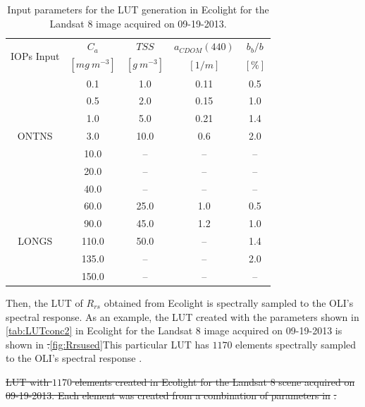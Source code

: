 \documentclass[onecolumn,3p,letterpaper]{elsarticle}
\providecommand{\DIFaddtex}[1]{{\protect\color{blue}\uwave{#1}}} %
\providecommand{\DIFdeltex}[1]{{\protect\color{red}\sout{#1}}}                      %
\providecommand{\DIFaddbegin}{} %
\providecommand{\DIFaddend}{} %
\providecommand{\DIFdelbegin}{} %
\providecommand{\DIFdelend}{} %
\providecommand{\DIFdelFL}[1]{\DIFdel{#1}} %
\providecommand{\DIFadd}[1]{\texorpdfstring{\DIFaddtex{#1}}{#1}} %
\providecommand{\DIFdel}[1]{\texorpdfstring{\DIFdeltex{#1}}{}} %
\begin{document}
\begin{table}[htb]
\caption{Input parameters for the LUT generation in Ecolight for the Landsat 8 image acquired on 09-19-2013. \label{tab:LUTconc2}} 
\small
\centering
    \begin{tabular}{ccccc}
    \hline \hline
    \multirow{2}{*}{IOPs Input} & \bfseries{$C_a$}    & \bfseries{$TSS$}  & \bfseries{$a_{CDOM}(440)$} & \bfseries{$b_b/b$}\\
               & $[mg~m^{-3}]$      & $[g~m^{-3}]$      &   $[1/m]$                  &  $[\%]$           \\ \hline \hline
\multirow{7}{*}{ONTNS} & 0.1   & 1.0  &  0.11 &  0.5 \\
                       & 0.5   & 2.0  &  0.15 &  1.0 \\
                       & 1.0   & 5.0  &  0.21 &  1.4 \\
                       & 3.0   & 10.0 &  0.6  &  2.0 \\
                       & 10.0  & --   &  --   &  --  \\
                       & 20.0  & --   &  --   &  --  \\
                       & 40.0  & --   &  --   &  --  \\ \hline

\multirow{5}{*}{LONGS} & 60.0  & 25.0 & 1.0   &  0.5 \\  
                       & 90.0  & 45.0 & 1.2   &  1.0 \\  
                       & 110.0 & 50.0 & --    &  1.4 \\  
                       & 135.0 & --   & --    &  2.0 \\  
                       & 150.0 & --   & --    &  --  \\  \hline \hline    
    \end{tabular}
	\end{table}

Then, the LUT of $R_{rs}$ obtained from Ecolight is spectrally sampled to the OLI's spectral response. As an example, the LUT created with the parameters shown in \autoref{tab:LUTconc2} in Ecolight for the Landsat 8 image acquired on 09-19-2013 is shown in \DIFdelbegin %
\DIFdel{.}\DIFdelend \DIFaddbegin \autoref{fig:Rrsused}\DIFadd{.(a). }\DIFaddend This particular LUT has $1170$ elements spectrally sampled to the OLI's spectral response\DIFdelbegin %
\DIFdelend .

\DIFdelbegin %
{%
\DIFdelFL{LUT with $1170$ elements created in Ecolight for the Landsat 8 scene acquired on 09-19-2013. Each element was created from a combination of parameters in }%
\DIFdelFL{.}}
\end{document}
